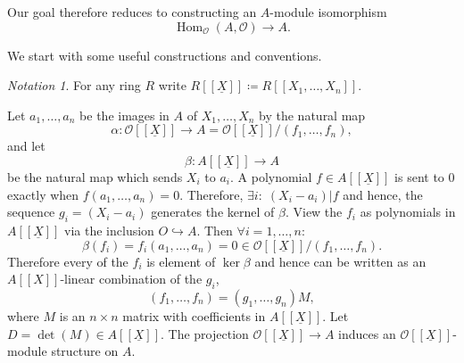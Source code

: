 \documentclass{article}
\theoremstyle{plain}%
\theoremstyle{definition}
\theoremstyle{remark}
\newtheorem*{notation}{Notation}
\renewcommand{\hom}{\operatorname{Hom}}
\begin{document}
Our goal therefore reduces to constructing an \(A\)-module isomorphism
\[
    \hom_\mathcal{O}(A, \mathcal{O}) \to A.
\]

We start with some useful constructions and conventions.
\begin{notation}
    For any ring \(R\) write \(R[[\underline{X}]] \coloneqq R[[X_1, \dots, X_n]]\).
\end{notation}
Let \(a_1, \dots, a_n\) be the images in \(A\) of \(X_1, \dots, X_n\) by the natural map
\[
    \alpha \colon \mathcal{O}[[\underline{X}]] \to A = \mathcal{O}[[\underline{X}]]/(f_1, \dots, f_n),
\]
and let
\[
    \beta \colon A[[\underline{X}]] \to A  
\]
be the natural map which sends \(X_i\) to \(a_i\). 
A polynomial \(f \in A[[\underline{X}]]\) is sent to \(0\) exactly when \(f(a_1, \dots, a_n) = 0\).
Therefore, \(\exists i\colon\; (X_i - a_i)|f\) and hence, 
the sequence \(g_i =  (X_i - a_i)\) generates the kernel of \(\beta\).
View the \(f_i\) as polynomials in \(A[[\underline{X}]]\) via the inclusion \(O \hookrightarrow A\). 
Then \(\forall i = 1, \dots, n\colon\)
\[
    \beta(f_i) = f_i(a_1, \dots, a_n) = 0 \in \mathcal{O}[[\underline{X}]]/(f_1, \dots, f_n).
\]
Therefore every of the \(f_i\) is element of \(\ker \beta\) and hence can be written as 
an \(A[[X]]\)-linear combination of the \(g_i\),
\[
    (f_1, \dots, f_n) = (g_1, \dots, g_n)M,  
\]
where \(M\) is an \(n \times n\) matrix with coefficients in \(A[[\underline{X}]]\). 
Let \(D = \det(M) \in A[[\underline{X}]]\).
The projection \(\mathcal{O}[[\underline{X}]] \to A\) induces an \(\mathcal{O}[[\underline{X}]]\)-module 
structure on \(A\).
\end{document}
